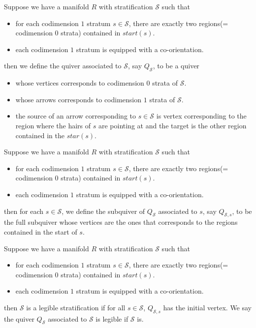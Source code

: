 \begin{definition}
Suppose we have a manifold $R$ with stratification $\mathcal{S}$ such that
\begin{itemize}
\item for each codimension $1$ stratum $s\in \mathcal{S}$, there are exactly two regions(= codimension $0$ strata) contained in $start(s)$.

\item each codimension $1$ stratum is equipped with a co-orientation.
\end{itemize}
then we define the quiver associated to $\mathcal{S}$, say $Q_{\mathcal{S}}$, to be a quiver
\begin{itemize}
\item whose vertices corresponds to codimension $0$ strata of $\mathcal{S}$.

\item whose arrows corresponds to codimension $1$ strata of $\mathcal{S}$.

\item the source of an arrow corresponding to $s\in \mathcal{S}$ is  vertex corresponding to the region where the hairs of $s$ are pointing at and the target is the other region contained in the $star(s)$.
\end{itemize}
\end{definition}

\begin{definition}
Suppose we have a manifold $R$ with stratification $\mathcal{S}$ such that
\begin{itemize}
\item for each codimension $1$ stratum $s\in \mathcal{S}$, there are exactly two regions(= codimension $0$ strata) contained in $start(s)$.

\item each codimension $1$ stratum is equipped with a co-orientation.
\end{itemize}
then for each $s\in \mathcal{S}$, we define the subquiver of $Q_{\mathcal{S}}$ associated to $s$, say $Q_{\mathcal{S},s}$, to be the full subquiver whose vertices are the ones that corresponds to the regions contained in the start of $s$.
\end{definition}

\begin{definition}
Suppose we have a manifold $R$ with stratification $\mathcal{S}$ such that
\begin{itemize}
\item for each codimension $1$ stratum $s\in \mathcal{S}$, there are exactly two regions(= codimension $0$ strata) contained in $start(s)$.

\item each codimension $1$ stratum is equipped with a co-orientation.
\end{itemize}
then $\mathcal{S}$ is a legible stratification if for all $s\in\mathcal{S}$, $Q_{\mathcal{S},s}$ has the initial vertex. We say the quiver $Q_{\mathcal{S}}$ associated to $\mathcal{S}$ is legible if $\mathcal{S}$ is.
\end{definition}

